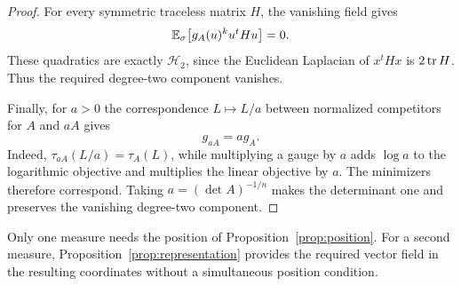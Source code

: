 \begin{proof}
For every symmetric traceless matrix $H$, the vanishing field gives
\[
 \mathbb E_{\sigma}\bigl[g_A(u)^k u^tHu\bigr]=0.
\]
These quadratics are exactly $\mathcal H_2$, since the Euclidean
Laplacian of $x^tHx$ is $2\operatorname{tr} H$. Thus the required degree-two
component vanishes.

Finally, for $a>0$ the correspondence $L\mapsto L/a$ between
normalized competitors for $A$ and $aA$ gives
\begin{equation}\label{eq:minimizer-scaling}
 g_{aA}=a g_A.
\end{equation}
Indeed, $\tau_{aA}(L/a)=\tau_A(L)$, while multiplying a gauge by
$a$ adds $\log a$ to the logarithmic objective and multiplies
the linear objective by $a$. The minimizers therefore correspond.
Taking $a=(\det A)^{-1/n}$ makes the determinant one and preserves
the vanishing degree-two component.
\end{proof}

Only one measure needs the position of Proposition~\ref{prop:position}.
For a second measure, Proposition~\ref{prop:representation} provides
the required vector field in the resulting coordinates without a
simultaneous position condition.
